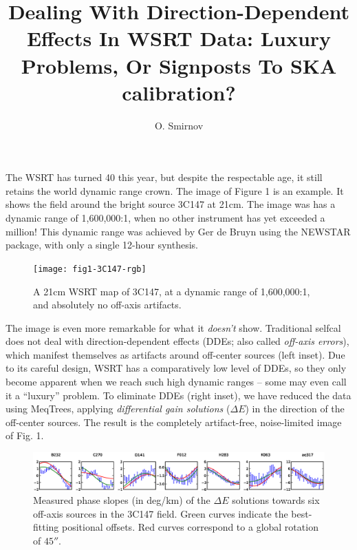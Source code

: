 \documentclass[]{article}
\begin{document}
\title{Dealing With Direction-Dependent Effects In WSRT Data: Luxury Problems, Or Signposts To SKA calibration?}

\author{O. Smirnov}

\maketitle

The WSRT has turned 40 this year, but despite the respectable age, it still retains the world dynamic range crown. The image of Figure 1 is an example. It shows the field around the bright source 3C147 at 21cm. The image was has a dynamic range of 1,600,000:1, when no other instrument has yet exceeded a million! This dynamic range was achieved by Ger de Bruyn using the NEWSTAR package, with only a single 12-hour synthesis.

\begin{figure}
\texttt{[image: fig1-3C147-rgb]}
\caption{A 21cm WSRT map of 3C147, at a dynamic range of 1,600,000:1, and absolutely no off-axis artifacts.}
\end{figure}
 
The image is even more remarkable for what it {\em doesn't} show. Traditional selfcal does not deal with direction-dependent effects (DDEs; also called {\em off-axis errors}), which manifest themselves as artifacts around off-center sources (left inset). Due to its careful design, WSRT has a comparatively low level of DDEs, so they only become apparent when we reach such high dynamic ranges -- some may even call it a ``luxury'' problem. To eliminate DDEs (right inset), we have reduced the data using MeqTrees, applying {\em differential gain solutions} ($\Delta E$) in the direction of the off-center sources. The result is the completely artifact-free, noise-limited image of Fig. 1.

\begin{figure}
\includegraphics[width=\textwidth]{o2003_dEphase_array_slopes}
\caption{Measured phase slopes (in deg/km) of the $\Delta E$ solutions towards six off-axis sources in the 3C147 field. Green curves indicate the best-fitting positional offsets. Red curves correspond to a global rotation of $45''$. }
\end{figure}
\end{document}
